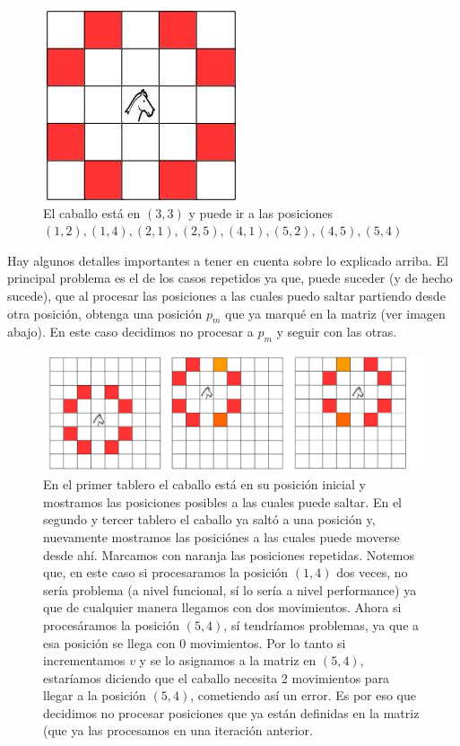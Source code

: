 \documentclass[a4paper]{article}
\begin{document}
\begin{figure}[h!]
\centering
\includegraphics[scale=0.5]{las8.jpg}\caption{El caballo está en $(3, 3)$ y puede ir a las posiciones $(1, 2), (1, 4), (2, 1), (2, 5), (4, 1), (5, 2), (4, 5), (5, 4)$}
\end{figure}

\vspace{0.3cm}
\noindent Hay algunos detalles importantes a tener en cuenta sobre lo explicado arriba. El principal problema es el de los casos repetidos ya que, puede suceder (y de hecho sucede), que al procesar las posiciones a las cuales puedo saltar partiendo desde otra posición, obtenga una posición $p_m$ que ya marqué en la matriz (ver imagen abajo). En este caso decidimos no procesar a $p_m$ y seguir con las otras.

\begin{figure}[h!]
\centering
\includegraphics[scale=0.4]{las8repetidas.jpg}\caption{En el primer tablero el caballo está en su posición inicial y mostramos las posiciones posibles a las cuales puede saltar. En el segundo y tercer tablero el caballo ya saltó a una posición y, nuevamente mostramos las posiciónes a las cuales puede moverse desde ahí. Marcamos con naranja las posiciones repetidas. Notemos que, en este caso si procesaramos la posición $(1, 4)$ dos veces, no sería problema (a nivel funcional, sí lo sería a nivel performance) ya que de cualquier manera llegamos con dos movimientos. Ahora si procesáramos la posición $(5, 4)$, sí tendríamos problemas, ya que a esa posición se llega con 0 movimientos. Por lo tanto si incrementamos $v$ y se lo asignamos a la matriz en $(5, 4)$, estaríamos diciendo que el caballo necesita 2 movimientos para llegar a la posición $(5, 4)$, cometiendo así un error. Es por eso que decidimos no procesar posiciones que ya están definidas en la matriz (que ya las procesamos en una iteración anterior.}
\end{figure}
\end{document}

